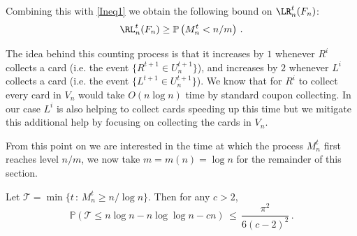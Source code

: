 \documentclass[11pt]{report}
\begin{document}
Combining this with \eqref{Ineq1} we obtain the following bound on 
$\LR^{t}_{n}(F_n)$:
\begin{equation}
\label{Ineq3}
\RL^{t}_{n}(F_n)  \geq 
\mathbb{P}\left(M^{t}_{n} 
< n/m\right) \,.
\end{equation} 


The idea behind this counting process is that it increases by $1$ 
whenever $R^{i}$ collects a card (i.e. the event $\{R^{t+1} \in U^{t+1}_{n}\}$), and increases by $2$ whenever 
$L^{i}$ collects a card (i.e. the event $\{L^{t+1} \in U^{t+1}_{n}\}$). We know that for $R^{i}$ to collect 
every card in $V_{n}$ would take $O(n\log n)$ time by standard 
coupon collecting. In our case $L^{i}$ is also helping to collect cards 
speeding up this time but we mitigate this additional help by focusing on collecting the cards in $V_{n}$. 	



From this point on we are interested in the time at which the process 
${M}^{t}_{n}$ first reaches level $n/m$, we now take $m=m(n) =\log n$ for the remainder of this section. 
\begin{lemma}\label{lem:lower_bound}
	Let $\mathcal{T} = \min\{t\,:\, M_n^t \ge n/\log n\}$. Then for any 
	$c>2$,
	\[\mathbb{P}(\mathcal{T} \leq n\log n - n \log 
	\log n 
	-cn)\, \leq \, \frac{\pi^{2}}{6(c-2)^2} \,. \] 
\end{lemma}
\end{document}
